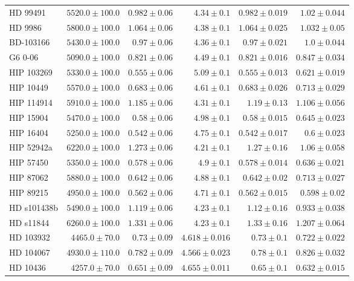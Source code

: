 \begin{longtable*}{lrrrrr}
HD 99491 & $5520.0\pm 100.0$ & $0.982\pm 0.06$ & $4.34\pm 0.1$ & $0.982\pm 0.019$ & $1.02\pm 0.044$ \\ 
HD 9986 & $5800.0\pm 100.0$ & $1.064\pm 0.06$ & $4.38\pm 0.1$ & $1.064\pm 0.025$ & $1.032\pm 0.05$ \\ 
BD-103166 & $5430.0\pm 100.0$ & $0.97\pm 0.06$ & $4.36\pm 0.1$ & $0.97\pm 0.021$ & $1.0\pm 0.044$ \\ 
G6 0-06 & $5090.0\pm 100.0$ & $0.821\pm 0.06$ & $4.49\pm 0.1$ & $0.821\pm 0.016$ & $0.847\pm 0.034$ \\ 
HIP 103269 & $5330.0\pm 100.0$ & $0.555\pm 0.06$ & $5.09\pm 0.1$ & $0.555\pm 0.013$ & $0.621\pm 0.019$ \\ 
HIP 10449 & $5570.0\pm 100.0$ & $0.683\pm 0.06$ & $4.61\pm 0.1$ & $0.683\pm 0.026$ & $0.713\pm 0.029$ \\ 
HIP 114914 & $5910.0\pm 100.0$ & $1.185\pm 0.06$ & $4.31\pm 0.1$ & $1.19\pm 0.13$ & $1.106\pm 0.056$ \\ 
HIP 15904 & $5470.0\pm 100.0$ & $0.58\pm 0.06$ & $4.98\pm 0.1$ & $0.58\pm 0.015$ & $0.645\pm 0.023$ \\ 
HIP 16404 & $5250.0\pm 100.0$ & $0.542\pm 0.06$ & $4.75\pm 0.1$ & $0.542\pm 0.017$ & $0.6\pm 0.023$ \\ 
HIP 52942a & $6220.0\pm 100.0$ & $1.273\pm 0.06$ & $4.21\pm 0.1$ & $1.27\pm 0.16$ & $1.06\pm 0.058$ \\ 
HIP 57450 & $5350.0\pm 100.0$ & $0.578\pm 0.06$ & $4.9\pm 0.1$ & $0.578\pm 0.014$ & $0.636\pm 0.021$ \\ 
HIP 87062 & $5880.0\pm 100.0$ & $0.642\pm 0.06$ & $4.88\pm 0.1$ & $0.642\pm 0.02$ & $0.713\pm 0.027$ \\ 
HIP 89215 & $4950.0\pm 100.0$ & $0.562\pm 0.06$ & $4.71\pm 0.1$ & $0.562\pm 0.015$ & $0.598\pm 0.02$ \\ 
HD s101438b & $5490.0\pm 100.0$ & $1.119\pm 0.06$ & $4.23\pm 0.1$ & $1.12\pm 0.16$ & $0.933\pm 0.038$ \\ 
HD s11844 & $6260.0\pm 100.0$ & $1.331\pm 0.06$ & $4.23\pm 0.1$ & $1.33\pm 0.16$ & $1.207\pm 0.064$ \\ 
HD 103932 & $4465.0\pm 70.0$ & $0.73\pm 0.09$ & $4.618\pm 0.016$ & $0.73\pm 0.1$ & $0.722\pm 0.022$ \\ 
HD 104067 & $4930.0\pm 110.0$ & $0.782\pm 0.09$ & $4.566\pm 0.023$ & $0.78\pm 0.1$ & $0.826\pm 0.032$ \\ 
HD 10436 & $4257.0\pm 70.0$ & $0.651\pm 0.09$ & $4.655\pm 0.011$ & $0.65\pm 0.1$ & $0.632\pm 0.015$ \\ 

\end{longtable*}

